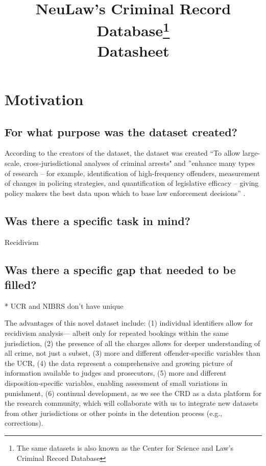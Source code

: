 \documentclass[letterpaper, 10 pt, conference]{ieeeconf}  %
\title{\LARGE \bf
NeuLaw's Criminal Record Database\footnote{The same datasets is also known as the Center for Science and Law’s Criminal Record Database} \\{\color{blue}Datasheet}
}
\begin{document}
\maketitle
\thispagestyle{empty}
\pagestyle{empty}

\section{Motivation}

\subsection{For what purpose was the dataset created?}

According to the creators of the dataset, the dataset was created ``To allow large-scale, cross-jurisdictional analyses of criminal arrests" and ''enhance many types of research -- for example, identification of high-frequency offenders, measurement of changes in policing strategies, and quantification of legislative efficacy -- giving policy makers the best data upon which to base law enforcement decisions'' \cite{ormachea2015new}.


\subsection{Was there a specific task in mind?}

Recidivism 

\subsection{Was there a specific gap that needed to be filled?}

* UCR and NIBRS don't have unique 

The advantages of this novel dataset include: (1)
individual identifiers allow for recidivism analysis—
albeit only for repeated bookings within the same
jurisdiction, (2) the presence of all the charges allows
for deeper understanding of all crime, not just a subset,
(3) more and different offender-specific variables than
the UCR, (4) the data represent a comprehensive and
growing picture of information available to judges and
prosecutors, (5) more and different disposition-specific
variables, enabling assessment of small variations in
punishment, (6) continual development, as we see the
CRD as a data platform for the research community,
which will collaborate with us to integrate new datasets
from other jurisdictions or other points in the detention
process (e.g., corrections).
\end{document}
